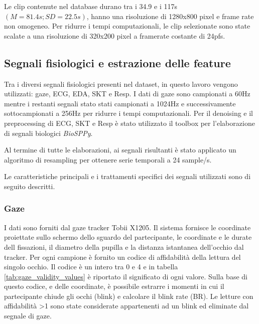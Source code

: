 Le clip contenute nel database durano tra i 34.9 e i 117s $(M=81.4s; SD=22.5s)$, hanno una risoluzione di 1280x800 pixel e frame rate non omogeneo. Per ridurre i tempi computazionali, le clip selezionate sono state scalate a una risoluzione di 320x200 pixel a framerate costante di 24pfs.

\subsection{Segnali fisiologici e estrazione delle feature}

Tra i diversi segnali fisiologici presenti nel dataset, in questo lavoro vengono utilizzati: gaze, ECG, EDA, SKT e Resp.
I dati di gaze sono campionati a 60Hz mentre i restanti segnali stato stati campionati a 1024Hz e successivamente sottocampionati a 256Hz per ridurre i tempi computazionali. Per il denoising e il preprocessing di ECG, SKT e Resp è stato utilizzato il toolbox per l'elaborazione di segnali biologici \textit{BioSPPy}\cite{carreiras2018biosppy}.

Al termine di tutte le elaborazioni, ai segnali risultanti è stato applicato un algoritmo di resampling per ottenere serie temporali a 24 sample/s.

Le caratteristiche principali e i trattamenti specifici dei segnali utilizzati sono di seguito descritti.

\subsubsection{Gaze}
I dati sono forniti dal gaze tracker Tobii X1205. Il sistema fornisce le coordinate proiettate sullo schermo dello sguardo del partecipante, le coordinate e le durate dell fissazioni, il diametro della pupilla e la distanza istantanea dell'occhio dal tracker. Per ogni campione è fornito un codice di affidabilità della lettura del singolo occhio. Il codice è un intero tra 0 e 4 e in tabella \ref{tab:gaze_validity_values} è riportato il significato di ogni valore. Sulla base di questo codice, e delle coordinate, è possibile estrarre i momenti in cui il partecipante chiude gli occhi (blink) e calcolare il blink rate (BR). Le letture con affidabilità >1 sono state considerate appartenenti ad un blink ed eliminate dal segnale di gaze.

